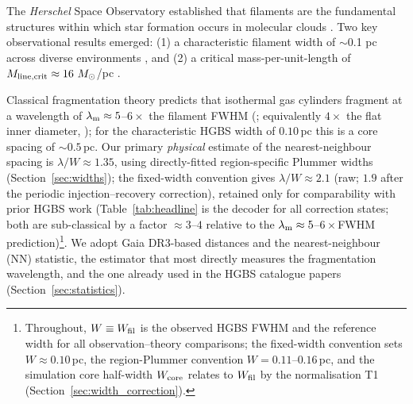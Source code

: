 \documentclass[usenatbib,twoside,twocolumn]{mnras}
\begin{document}
The \textit{Herschel} Space Observatory established that filaments are the fundamental structures within which star formation occurs in molecular clouds \citep{Andre2010}. Two key observational results emerged: (1) a characteristic filament width of $\sim$0.1 pc across diverse environments \citep{Arzoumanian2011}, and (2) a critical mass-per-unit-length of $M_{\rm line,crit} \approx 16~M_\odot$/pc \citep{Ostriker1964}.

Classical fragmentation theory \citep{Inutsuka1992} predicts that isothermal gas cylinders fragment at a wavelength of $\lambda_{\rm m}\approx5$--$6\times$ the filament FWHM (\citealt{Fischera2012}; equivalently $4\times$ the flat inner diameter, \citealt{Inutsuka1992}); for the characteristic HGBS width of $0.10$\,pc this is a core spacing of $\sim0.5$\,pc. Our primary \emph{physical} estimate of the nearest-neighbour spacing is $\lambda/W\approx1.35$, using directly-fitted region-specific Plummer widths (Section~\ref{sec:widths}); the fixed-width convention gives $\lambda/W\approx2.1$ (raw; $1.9$ after the periodic injection--recovery correction), retained only for comparability with prior HGBS work (Table~\ref{tab:headline} is the decoder for all correction states; both are sub-classical by a factor $\approx3$--$4$ relative to the $\lambda_{\rm m}\approx5$--$6\times$FWHM prediction)\footnote{Throughout, $W\equiv W_{\rm fil}$ is the observed HGBS FWHM and the reference width for all observation--theory comparisons; the fixed-width convention sets $W\approx0.10$\,pc, the region-Plummer convention $W=0.11$--$0.16$\,pc, and the simulation core half-width $W_{\rm core}$ relates to $W_{\rm fil}$ by the normalisation T1 (Section~\ref{sec:width_correction}).}. We adopt Gaia DR3-based distances \citep{Zhang2023} and the nearest-neighbour (NN) statistic, the estimator that most directly measures the fragmentation wavelength, and the one already used in the HGBS catalogue papers \citep{Konyves2015,Konyves2020} (Section~\ref{sec:statistics}).
\end{document}
